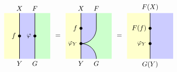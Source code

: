 \[\begin{tikzpicture}[x=0.8cm,y=0.8cm, baseline=(current bounding box.center)]
\begin{scope} [shift={(4,0)}]
        \fill[leftcolor] (0,0) rectangle (1,3);
        \fill[blue!20] (1,0) rectangle (2,3);
        \fill[green!20] (2,0) rectangle (3,3);
     
        \draw[line width=0.7pt] (1,0) -- (1,3);
        \draw[line width=0.7pt] (2,0) -- (2,3);
        \filldraw [black] (1,1.5) circle (2pt) node[left=2pt] {$f$};
        \filldraw [black] (2,1.5) circle (2pt) node[left=2pt] {$\varphi$};
        \draw (1,0) node[below] {$Y$};
        \draw (1,3) node[above] {$X$};
        \draw (2,0) node[below] {$G$};
        \draw (2,3) node[above] {$F$};
        \draw (3.5,1.5) node {$=$};
    \end{scope} 
    
    \begin{scope}[shift={(8,0)}]
        \definecolor{leftcolor}{RGB}{255,255,204} %
        \definecolor{rightcolor}{RGB}{204,204,255} %
    
        \fill[leftcolor] (0,0) rectangle (1,3);
        \fill[green!20] (1,0) rectangle (3,3);
        \begin{scope} 
            \clip (1,0) rectangle (3, 3); 
            \draw[fill=blue!20, rounded corners=0.8cm, line width=0.7pt] (0,1) rectangle (2, 4);
            \draw[fill=blue!20, rounded corners=0.8cm, line width=0.7pt] (0,1) rectangle (2, -2);
        \end{scope} 
        \draw[line width=0.7pt] (1,0) -- (1,3);
        \filldraw [black] (1,1) circle (2pt) node[left=2pt] {$\varphi_Y$};
        \filldraw [black] (1,2) circle (2pt) node[left=2pt] {$f$};
        \draw (1,0) node[below] {$Y$};
        \draw (1,3) node[above] {$X$};
        \draw (2,0) node[below] {$G$};
        \draw (2,3) node[above] {$F$};
        \draw (3.5,1.5) node {$=$};
    \end{scope} 
    
    \begin{scope} [shift={(12.5,0)}]
        \fill[leftcolor] (-0.5,0) rectangle (1,3);
        \fill[rightcolor] (1,0) rectangle (2.5,3);
    
        \draw[line width=0.7pt] (1,0) -- (1,3);
        \filldraw [black] (1,2) circle (2pt) node[left=2pt] {$F(f)$};
        \filldraw [black] (1,1) circle (2pt) node[left=2pt] {$\varphi_Y$};
        \draw (1,0) node[below] {$G(Y)$};
        \draw (1,3) node[above] {$F(X)$};
    \end{scope} 
    \end{tikzpicture}
    \]

